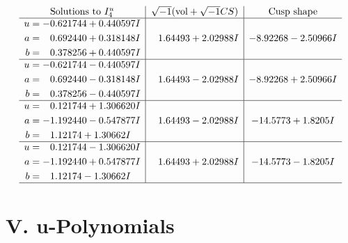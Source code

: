\documentclass[1p]{elsarticle_modified}
\theoremstyle{definition}
\newcommand{\I}{\sqrt{-1}}
\begin{document}
$$\begin{array}{c|c|c}  
\text{Solutions to }I^u_{4}& \I (\text{vol} + \sqrt{-1}CS) & \text{Cusp shape}\\
 \hline 
\begin{aligned}
u &= -0.621744 + 0.440597 I \\
a &= \phantom{-}0.692440 + 0.318148 I \\
b &= \phantom{-}0.378256 + 0.440597 I\end{aligned}
 & \phantom{-}1.64493 + 2.02988 I & -8.92268 - 2.50966 I \\ \hline\begin{aligned}
u &= -0.621744 - 0.440597 I \\
a &= \phantom{-}0.692440 - 0.318148 I \\
b &= \phantom{-}0.378256 - 0.440597 I\end{aligned}
 & \phantom{-}1.64493 - 2.02988 I & -8.92268 + 2.50966 I \\ \hline\begin{aligned}
u &= \phantom{-}0.121744 + 1.306620 I \\
a &= -1.192440 - 0.547877 I \\
b &= \phantom{-}1.12174 + 1.30662 I\end{aligned}
 & \phantom{-}1.64493 - 2.02988 I & -14.5773 + 1.8205 I \\ \hline\begin{aligned}
u &= \phantom{-}0.121744 - 1.306620 I \\
a &= -1.192440 + 0.547877 I \\
b &= \phantom{-}1.12174 - 1.30662 I\end{aligned}
 & \phantom{-}1.64493 + 2.02988 I & -14.5773 - 1.8205 I\\
 \hline 
 \end{array}$$\newpage
\newpage\renewcommand{\arraystretch}{1}
\centering \section*{ V. u-Polynomials}
\end{document}
